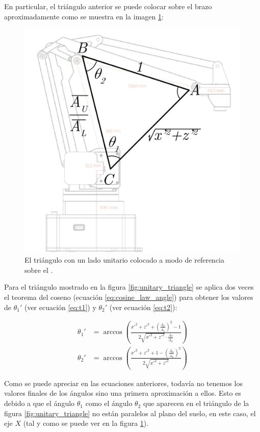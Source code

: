 En particular, el triángulo anterior se puede colocar sobre el brazo aproximadamente
como se muestra en la imagen \ref{fig:u_triangle_over_arm}:

\begin{figure}[H]
    \centering
    \includegraphics[width=.6\linewidth]{pictures/ik_triangle_over_arm.png}
    \caption{El triángulo con un lado unitario colocado a modo de referencia sobre el \pArm{}.}
    \label{fig:u_triangle_over_arm}
\end{figure}

Para el triángulo mostrado en la figura \ref{fig:unitary_triangle} se aplica
dos veces el teorema del coseno (ecuación \ref{eq:cosine_law_angle}) para obtener
los valores de $\theta_1'$ (ver ecuación \ref{eq:t1}) y $\theta_2'$ (ver ecuación \ref{eq:t2}):

\begin{align}
    \theta_1' & = \arccos{\left(\frac{x'^2 + z'^2 + \left(\frac{\overline{A_U}}{\overline{A_L}}\right)^2 - 1} %
    {2\sqrt{x'^2 + z'^2} \cdot \frac{\overline{A_U}}{\overline{A_L}}}\right)} \label{eq:t1}                   \\[2ex]
    \theta_2' & = \arccos{\left(\frac{x'^2 + z'^2 + 1 - \left(\frac{\overline{A_U}}{\overline{A_L}}\right)^2} %
        {2\sqrt{x'^2 + z'^2}}\right)} \label{eq:t2}
\end{align}

Como se puede apreciar en las ecuaciones anteriores, todavía no tenemos los valores finales
de los ángulos sino una primera aproximación a ellos. Esto es debido a que el ángulo
$\theta_1$ como el ángulo $\theta_2$ que aparecen en el triángulo de la figura \ref{fig:unitary_triangle}
no están paralelos al plano del suelo, en este caso, el eje $X$ (tal y como se puede ver
en la figura \ref{fig:u_triangle_over_arm}).

